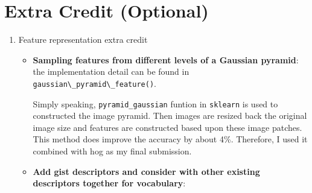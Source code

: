 \section*{Extra Credit (Optional)}
\begin{enumerate}
    \item Feature representation extra credit
          \begin{itemize}
              \item \textbf{Sampling features from different levels of a Gaussian pyramid}: the implementation detail can be found in \verb|gaussian\_pyramid\_feature()|. 
              
              Simply speaking, \verb|pyramid_gaussian| funtion in \verb|sklearn| is used to constructed the image pyramid. Then images are resized back the original image size and features are constructed based upon these image patches. This method does improve the accuracy by about 4\%. Therefore, I used it combined with hog as my final submission.
              \item \textbf{Add gist descriptors and consider with other existing descriptors together for vocabulary}: 
              

\end{itemize}
\end{enumerate}
